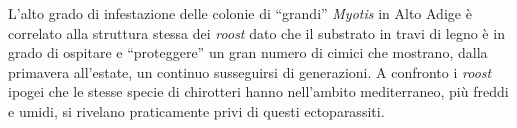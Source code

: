 {L’alto grado di infestazione delle colonie di ``grandi'' \emph{Myotis} in Alto Adige è correlato alla struttura stessa dei \textit{roost} dato che il substrato in travi di legno è in grado di ospitare e ``proteggere'' un gran numero di cimici che mostrano, dalla primavera all’estate, un continuo susseguirsi di generazioni. A confronto i \textit{roost} ipogei che le stesse specie di chirotteri hanno nell’ambito mediterraneo, più freddi e umidi, si rivelano praticamente privi di questi ectoparassiti.
} %